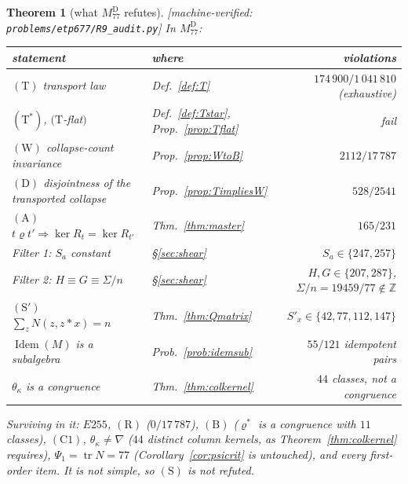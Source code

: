 \documentclass[11pt]{article}
\theoremstyle{plain}
\newtheorem{theorem}{Theorem}[section]
\theoremstyle{definition}
\theoremstyle{remark}
\numberwithin{equation}{section}
\newcommand{\Z}{\mathbb{Z}}
\newcommand{\op}{\mathbin{*}}
\newcommand{\tr}{\operatorname{tr}}
\newcommand{\Idem}{\operatorname{Idem}}
\newcommand{\statusbox}[1]{{\small\sloppy\textsf{[#1]}}}
\newcommand{\MV}[1]{\statusbox{machine-verified: \texttt{#1}}}
\begin{document}
\begin{theorem}[what $M_{77}^{\mathrm{D}}$ refutes]\label{thm:refutations}
\MV{problems\slash etp677\slash R9\_audit.py}
In $M_{77}^{\mathrm{D}}$:
\begin{center}
{\footnotesize
\begin{tabular}{llr}
\toprule
statement & where & violations\\
\midrule
$(\mathrm{T})$ transport law & Def.~\ref{def:T} & $174\,900/1\,041\,810$ (exhaustive)\\
$(\mathrm{T}^{*})$, $(\mathrm{T}$-flat$)$ & Def.~\ref{def:Tstar}, Prop.~\ref{prop:Tflat} & fail\\
$(\mathrm{W})$ collapse-count invariance & Prop.~\ref{prop:WtoB} & $2112/17\,787$\\
$(\mathrm{D})$ disjointness of the transported collapse & Prop.~\ref{prop:TimpliesW} & $528/2541$\\
$(\mathrm{A})$ $t\mathrel\varrho t'\Rightarrow\ker R_t = \ker R_{t'}$ & Thm.~\ref{thm:master} & $165/231$\\
Filter 1: $S_a$ constant & \S\ref{sec:shear} & $S_a\in\{247,257\}$\\
Filter 2: $H\equiv G\equiv\Sigma/n$ & \S\ref{sec:shear} & $H,G\in\{207,287\}$, $\Sigma/n = 19459/77\notin\Z$\\
$(\mathrm{S}')$ $\sum_zN(z,z\op x) = n$ & Thm.~\ref{thm:Qmatrix} & $S'_x\in\{42,77,112,147\}$\\
$\Idem(M)$ is a subalgebra & Prob.~\ref{prob:idemsub} & $55/121$ idempotent pairs\\
$\theta_\kappa$ is a congruence & Thm.~\ref{thm:colkernel} & $44$ classes, not a congruence\\
\bottomrule
\end{tabular}}
\end{center}
Surviving in it: $E255$, $(\mathrm{R})$ ($0/17\,787$), $(\mathrm{B})$ ($\varrho^{*}$
is a congruence with $11$ classes), $(\mathrm{C1})$, $\theta_\kappa\ne\nabla$
($44$ distinct column kernels, as Theorem~\ref{thm:colkernel} requires),
$\Psi_1 = \tr N = 77$ (Corollary~\ref{cor:psicrit} is untouched), and every
first-order item. It is \emph{not} simple, so $(\mathrm{S})$ is not refuted.


\end{theorem}
\end{document}
